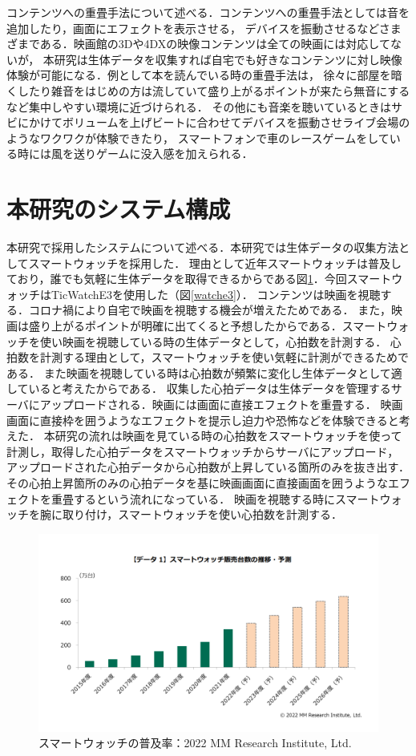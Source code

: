 コンテンツへの重畳手法について述べる．コンテンツへの重畳手法としては音を追加したり，画面にエフェクトを表示させる，
デバイスを振動させるなどさまざまである．映画館の3Dや4DXの映像コンテンツは全ての映画には対応してないが，
本研究は生体データを収集すれば自宅でも好きなコンテンツに対し映像体験が可能になる．例として本を読んでいる時の重畳手法は，
徐々に部屋を暗くしたり雑音をはじめの方は流していて盛り上がるポイントが来たら無音にするなど集中しやすい環境に近づけられる．
その他にも音楽を聴いているときはサビにかけてボリュームを上げビートに合わせてデバイスを振動させライブ会場のようなワクワクが体験できたり，
スマートフォンで車のレースゲームをしている時には風を送りゲームに没入感を加えられる．

\section{本研究のシステム構成}
本研究で採用したシステムについて述べる．本研究では生体データの収集方法としてスマートウォッチを採用した．
理由として近年スマートウォッチは普及しており，誰でも気軽に生体データを取得できるからである図\ref{watchfukyuu}．今回スマートウォッチはTicWatchE3を使用した（図\ref{watche3}）．
コンテンツは映画を視聴する．コロナ禍により自宅で映画を視聴する機会が増えたためである．
また，映画は盛り上がるポイントが明確に出てくると予想したからである．スマートウォッチを使い映画を視聴している時の生体データとして，心拍数を計測する．
心拍数を計測する理由として，スマートウォッチを使い気軽に計測ができるためである．
また映画を視聴している時は心拍数が頻繁に変化し生体データとして適していると考えたからである．
収集した心拍データは生体データを管理するサーバにアップロードされる．映画には画面に直接エフェクトを重畳する．
映画画面に直接枠を囲うようなエフェクトを提示し迫力や恐怖などを体験できると考えた．
本研究の流れは映画を見ている時の心拍数をスマートウォッチを使って計測し，取得した心拍データをスマートウォッチからサーバにアップロード，
アップロードされた心拍データから心拍数が上昇している箇所のみを抜き出す．
その心拍上昇箇所のみの心拍データを基に映画画面に直接画面を囲うようなエフェクトを重畳するという流れになっている．
映画を視聴する時にスマートウォッチを腕に取り付け，スマートウォッチを使い心拍数を計測する．



\begin{figure}[H]
    \centering
    \includegraphics[width=14cm]{images/chapter3/watchreserch.png}
    \caption{スマートウォッチの普及率：2022 MM Research Institute, Ltd.}
    \label{watchfukyuu}
\end{figure}

